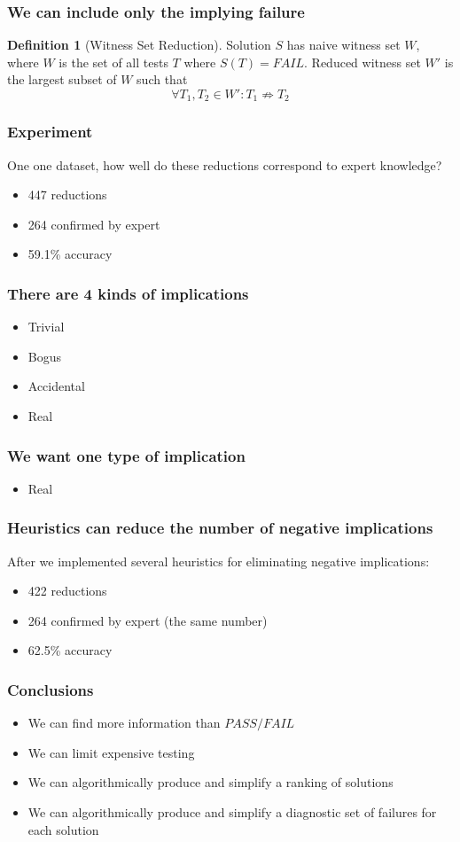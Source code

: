 \documentclass[svgnames]{beamer}
\newcommand\fail{\mathit{FAIL}}
\newcommand\pass{\mathit{PASS}}
\theoremstyle{definition}
\newtheorem{defn}{Definition}
\begin{document}
\begin{frame}
\frametitle{We can include only the implying failure}
\begin{defn}[Witness Set Reduction]
Solution $S$ has naive witness set $W$, where $W$ is the set of all tests $T$ where $S(T) = \fail$.
Reduced witness set $W'$ is the largest subset of $W$ such that
$$\forall T_1, T_2 \in W' : T_1 \not\Rightarrow T_2$$
\end{defn}
\end{frame}

\begin{frame}
\frametitle{Experiment}
One one dataset, how well do these reductions correspond to expert knowledge?
\end{frame}

\begin{frame}
\begin{itemize}
\item 447 reductions
\item 264 confirmed by expert
\item 59.1\% accuracy
\end{itemize}
\end{frame}

\begin{frame}
\frametitle{There are 4 kinds of implications}
\begin{itemize}
\item Trivial
\item Bogus
\item Accidental
\item Real
\end{itemize}
\end{frame}

\begin{frame}
\frametitle{We want one type of implication}
\begin{itemize}
\item Real
\end{itemize}
\end{frame}

\begin{frame}
\frametitle{Heuristics can reduce the number of negative implications}
After we implemented several heuristics for eliminating negative implications:
\begin{itemize}
\item 422 reductions
\item 264 confirmed by expert (the same number)
\item 62.5\% accuracy
\end{itemize}
\end{frame}

\begin{frame}
\frametitle{Conclusions}
\begin{itemize}
\item We can find more information than $\pass/\fail$
\item We can limit expensive testing
\item We can algorithmically produce and simplify a ranking of solutions
\item We can algorithmically produce and simplify a diagnostic set of failures for each solution
\end{itemize}
\end{frame}
\end{document}
